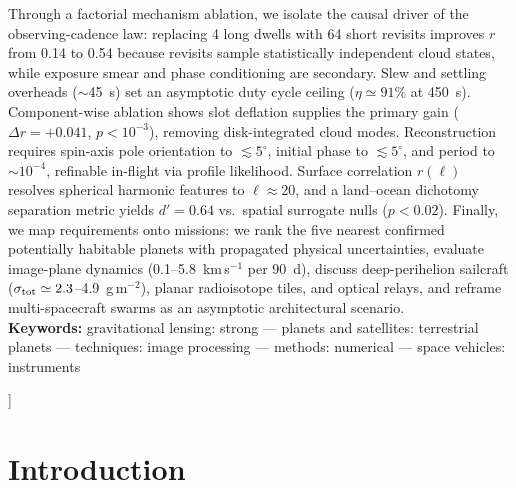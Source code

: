 \documentclass[twocolumn,10pt]{article}
\begin{document}
{\begin{center}
\begin{minipage}{0.86\textwidth}
Through a factorial mechanism ablation, we isolate the causal driver of the
observing-cadence law: replacing 4 long dwells with 64 short revisits
improves $r$ from 0.14 to 0.54 because revisits sample statistically
independent cloud states, while exposure smear and phase conditioning are
secondary. Slew and settling overheads ($\sim$45~s) set an asymptotic duty
cycle ceiling ($\eta\simeq91\%$ at 450~s). Component-wise ablation shows
slot deflation supplies the primary gain ($\Delta r=+0.041$, $p<10^{-3}$),
removing disk-integrated cloud modes. Reconstruction requires spin-axis pole
orientation to $\lesssim5^\circ$, initial phase to $\lesssim5^\circ$, and
period to $\sim10^{-4}$, refinable in-flight via profile likelihood. Surface
correlation $r(\ell)$ resolves spherical harmonic features to $\ell\approx20$,
and a land--ocean dichotomy separation metric yields $d'=0.64$ vs.\ spatial
surrogate nulls ($p<0.02$). Finally, we map requirements onto missions: we
rank the five nearest confirmed potentially habitable planets with propagated
physical uncertainties, evaluate image-plane dynamics
(0.1--5.8~km\,s$^{-1}$ per 90~d), discuss deep-perihelion sailcraft
($\sigma_{\rm tot}\simeq2.3$--4.9~g\,m$^{-2}$), planar radioisotope tiles, and
optical relays, and reframe multi-spacecraft swarms as an asymptotic
architectural scenario.
\\[2mm]
\textbf{Keywords:} gravitational lensing: strong --- planets and
satellites: terrestrial planets --- techniques: image processing ---
methods: numerical --- space vehicles: instruments
\end{minipage}
\end{center}
\vspace{6mm}
}]




\section{Introduction}
\label{sec:intro}
\end{document}
